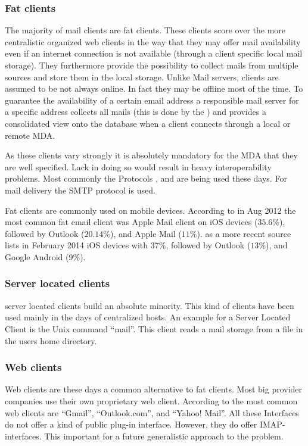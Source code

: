 \subsubsection{Fat clients}
The majority of mail clients are fat clients. These clients score over the more centralistic organized web clients in the way that they may offer mail availability even if an internet connection is not available (through a client specific local mail storage). They furthermore provide the possibility to collect mails from multiple sources and store them in the local storage. Unlike Mail servers, clients are assumed to be not always online. In fact they may be offline most of the time. To guarantee the availability of a certain email address a responsible mail server for a specific address collects all mails (this is done by the ) and provides a consolidated view onto the database when a client connects through a local or remote MDA.\par

As these clients vary strongly it is absolutely mandatory for the MDA that they are well specified. Lack in doing so would result in heavy interoperability problems. Most commonly the Protocols ,  and  are being used these days. For mail delivery the SMTP protocol is used. \par

Fat clients are commonly used on mobile devices. According to  \cite{clientDistribution} in Aug 2012 the most common fat email client was Apple Mail client on iOS devices ($35.6\%$), followed by Outlook ($20.14\%$), and Apple Mail ($11\%$). \cite{clientDistribution2} as a more recent source lists in February 2014 iOS devices with $37\%$, followed by Outlook ($13\%$), and  Google Android ($9\%$).

\subsubsection{Server located clients}
server located clients build an absolute minority. This kind of clients have been used mainly in the days of centralized hosts. An example for a Server Located Client is the Unix command "`mail"'. This client reads a mail storage from a file in the users home directory.

\subsubsection{Web clients}
Web clients are these days a common alternative to fat clients. Most big provider companies use their own proprietary web client. According to \cite{clientDistribution2} the most common web clients are "`Gmail"', "`Outlook.com"', and "`Yahoo! Mail"'. All these Interfaces do not offer a kind of public plug-in interface. However,  they do offer IMAP-interfaces. This important for a future generalistic approach to the problem.

